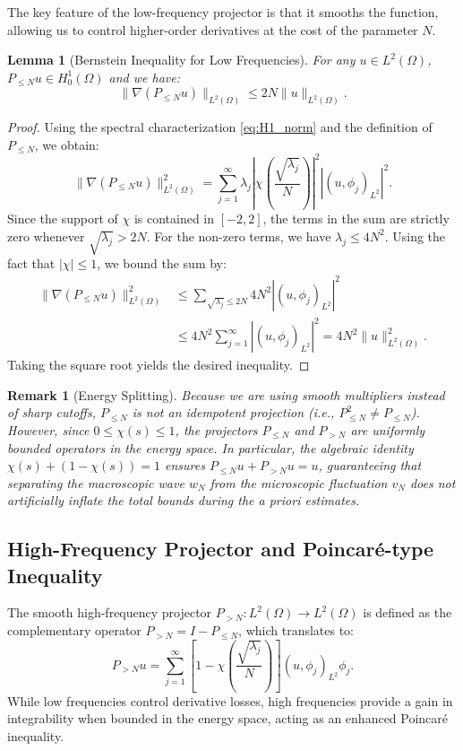 \documentclass[11pt,letterpaper]{amsart}
\newtheorem{lemma}[theorem]{Lemma}
\newtheorem{remark}[theorem]{Remark}
\begin{document}
The key feature of the low-frequency projector is that it smooths the function, allowing us to control higher-order derivatives at the cost of the parameter $N$.

\begin{lemma}[Bernstein Inequality for Low Frequencies]\label{lem:bernstein_low}
For any $u \in L^2(\Omega)$, $P_{\le N} u \in H^1_0(\Omega)$ and we have:
\begin{equation}
    \|\nabla (P_{\le N} u)\|_{L^2(\Omega)} \le 2 N \|u\|_{L^2(\Omega)}.
\end{equation}
\end{lemma}
\begin{proof}
Using the spectral characterization \eqref{eq:H1_norm} and the definition of $P_{\le N}$, we obtain:
\begin{equation*}
    \|\nabla (P_{\le N} u)\|_{L^2(\Omega)}^2 = \sum_{j=1}^\infty \lambda_j \left| \chi\left(\frac{\sqrt{\lambda_j}}{N}\right) \right|^2 |(u, \phi_j)_{L^2}|^2.
\end{equation*}
Since the support of $\chi$ is contained in $[-2, 2]$, the terms in the sum are strictly zero whenever $\sqrt{\lambda_j} > 2N$. For the non-zero terms, we have $\lambda_j \le 4N^2$. Using the fact that $|\chi| \le 1$, we bound the sum by:
\begin{align*}
    \|\nabla (P_{\le N} u)\|_{L^2(\Omega)}^2 &\le \sum_{\sqrt{\lambda_j} \le 2N} 4N^2 |(u, \phi_j)_{L^2}|^2 \\
    &\le 4N^2 \sum_{j=1}^\infty |(u, \phi_j)_{L^2}|^2 = 4N^2 \|u\|_{L^2(\Omega)}^2.
\end{align*}
Taking the square root yields the desired inequality.
\end{proof}

\begin{remark}[Energy Splitting]
Because we are using smooth multipliers instead of sharp cutoffs, $P_{\le N}$ is not an idempotent projection (i.e., $P_{\le N}^2 \neq P_{\le N}$). However, since $0 \le \chi(s) \le 1$, the projectors $P_{\le N}$ and $P_{>N}$ are uniformly bounded operators in the energy space. In particular, the algebraic identity $\chi(s) + (1-\chi(s)) = 1$ ensures $P_{\le N} u + P_{> N} u = u$, guaranteeing that separating the macroscopic wave $w_N$ from the microscopic fluctuation $v_N$ does not artificially inflate the total bounds during the a priori estimates.
\end{remark}

\subsection{High-Frequency Projector and Poincaré-type Inequality}
The smooth high-frequency projector $P_{>N}: L^2(\Omega) \to L^2(\Omega)$ is defined as the complementary operator $P_{> N} = I - P_{\le N}$, which translates to:
\begin{equation}
    P_{> N} u = \sum_{j=1}^\infty \left[ 1 - \chi\left(\frac{\sqrt{\lambda_j}}{N}\right) \right] (u, \phi_j)_{L^2} \phi_j.
\end{equation}
While low frequencies control derivative losses, high frequencies provide a gain in integrability when bounded in the energy space, acting as an enhanced Poincaré inequality.
\end{document}
